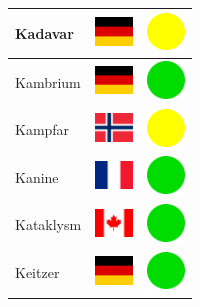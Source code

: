 \documentclass[12pt, a4paper, twoside]{report}
\begin{document}
\begin{center}
\begin{longtable}{|p{5cm}|p{2cm}|p{2cm}|}
			Kadavar & \includegraphics[width=1cm]{4x3/de} & \includegraphics[width=1cm]{likes/m} \\ \hline
			Kambrium & \includegraphics[width=1cm]{4x3/de} & \includegraphics[width=1cm]{likes/y} \\ \hline
			Kampfar & \includegraphics[width=1cm]{4x3/no} & \includegraphics[width=1cm]{likes/m} \\ \hline
			Kanine & \includegraphics[width=1cm]{4x3/fr} & \includegraphics[width=1cm]{likes/y} \\ \hline
			Kataklysm & \includegraphics[width=1cm]{4x3/ca} & \includegraphics[width=1cm]{likes/y} \\ \hline
			Keitzer & \includegraphics[width=1cm]{4x3/de} & \includegraphics[width=1cm]{likes/y} \\ \hline

\end{longtable}
\end{center}
\end{document}
